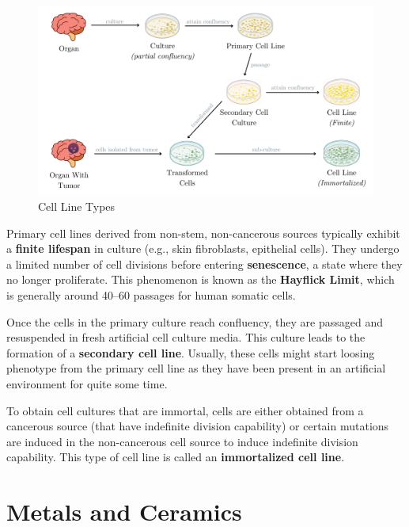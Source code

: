 \documentclass[12pt]{article}
\begin{document}
\begin{figure}[h]
    \centering
    \includegraphics[width=1\textwidth]{figures/section_2/cell_cultures.png}
    \caption{Cell Line Types}\label{fig:cell_line_types}
\end{figure}

Primary cell lines derived from non-stem, non-cancerous sources typically
exhibit a \textbf{finite lifespan} in culture (e.g., skin fibroblasts,
epithelial cells). They undergo a limited number of cell divisions before
entering \textbf{senescence}, a state where they no longer proliferate. This
phenomenon is known as the \textbf{Hayflick Limit}, which is generally around
40--60 passages for human somatic cells.

Once the cells in the primary culture reach confluency, they are passaged and
resuspended in fresh artificial cell culture media. This culture leads to the
formation of a \textbf{secondary cell line}. Usually, these cells might start
loosing phenotype from the primary cell line as they have been present in an
artificial environment for quite some time.

To obtain cell cultures that are immortal, cells are either obtained from a
cancerous source (that have indefinite division capability) or certain
mutations are induced in the non-cancerous cell source to induce indefinite
division capability. This type of cell line is called an \textbf{immortalized
    cell line}.

\section{Metals and Ceramics}
\end{document}
